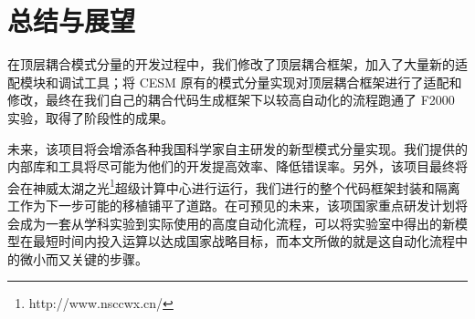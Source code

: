 \chapter{总结与展望}
\label{cha:further}

在顶层耦合模式分量的开发过程中，我们修改了顶层耦合框架，加入了大量新的适配模块和调试工具；将 CESM 原有的模式分量实现对顶层耦合框架进行了适配和修改，最终在我们自己的耦合代码生成框架下以较高自动化的流程跑通了 F2000 实验，取得了阶段性的成果。

未来，该项目将会增添各种我国科学家自主研发的新型模式分量实现。我们提供的内部库和工具将尽可能为他们的开发提高效率、降低错误率。另外，该项目最终将会在神威太湖之光\footnote{http://www.nsccwx.cn/}超级计算中心进行运行，我们进行的整个代码框架封装和隔离工作为下一步可能的移植铺平了道路。在可预见的未来，该项国家重点研发计划将会成为一套从学科实验到实际使用的高度自动化流程，可以将实验室中得出的新模型在最短时间内投入运算以达成国家战略目标，而本文所做的就是这自动化流程中的微小而又关键的步骤。
